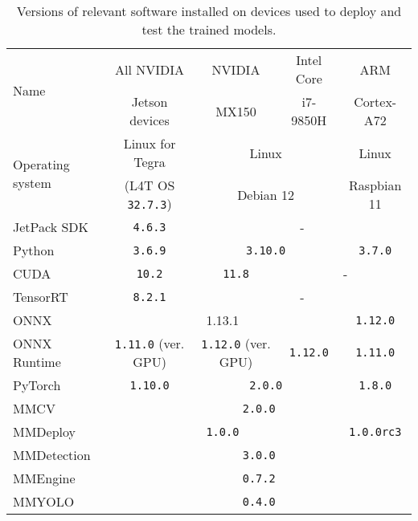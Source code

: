 \begin{table}[h]
\centering
\small
\begin{tabular}{|l|c|c|c|c|}
    \hline
    \multirow{2}{*}{Name} & All NVIDIA     & NVIDIA & Intel Core  & ARM \\
                          & Jetson devices & MX150  & i7-9850H    & Cortex-A72 \\
    \hline
    \multirow{2}{*}{Operating system} & Linux for Tegra             & \multicolumn{2}{c|}{Linux}     & Linux   \\
                                      & (L4T OS \texttt{32.7.3}) & \multicolumn{2}{c|}{Debian 12} & Raspbian 11   \\
    \hline
    JetPack SDK      & \texttt{4.6.3}                     & \multicolumn{3}{c|}{-}  \\
    \hline
    Python           & \texttt{3.6.9}                     & \multicolumn{2}{c|}{\texttt{3.10.0}} & \texttt{3.7.0} \\
    \hline
    CUDA             & \texttt{10.2}                      & \texttt{11.8} & \multicolumn{2}{c|}{-} \\
    \hline
    TensorRT         & \texttt{8.2.1} & \multicolumn{3}{c|}{-}             \\
    \hline
    ONNX             & \multicolumn{3}{c|}{1.13.1} & \texttt{1.12.0}             \\
    \hline
    ONNX Runtime     & \texttt{1.11.0} (ver. GPU) & \texttt{1.12.0} (ver. GPU) & \texttt{1.12.0} & \texttt{1.11.0}            \\
    \hline
    PyTorch          & \texttt{1.10.0} & \multicolumn{2}{c|}{\texttt{2.0.0}} & \texttt{1.8.0} \\
    \hline
    MMCV             & \multicolumn{4}{c|}{\texttt{2.0.0}} \\
    \hline
    MMDeploy         & \multicolumn{3}{c|}{\texttt{1.0.0}} & \texttt{1.0.0rc3} \\
    \hline
    MMDetection      & \multicolumn{4}{c|}{\texttt{3.0.0}} \\
    \hline
    MMEngine         & \multicolumn{4}{c|}{\texttt{0.7.2}} \\
    \hline
    MMYOLO           & \multicolumn{4}{c|}{\texttt{0.4.0}} \\
    \hline
\end{tabular}
\caption{Versions of relevant software installed on devices used to deploy and test the trained models.}
\label{DevicesPackages}
\end{table}



